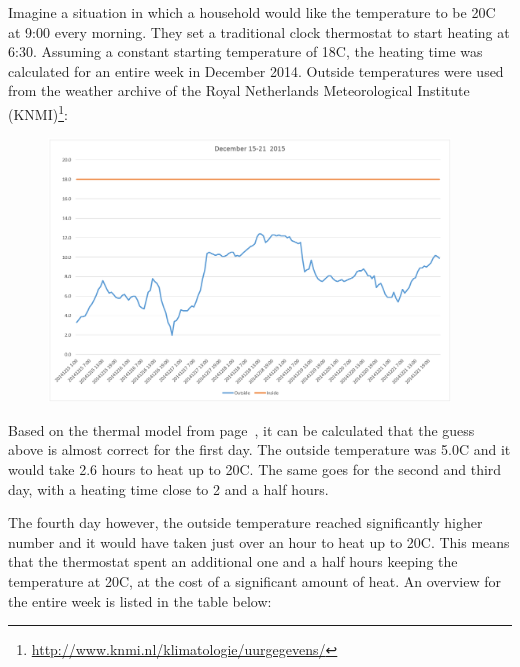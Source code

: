 \documentclass[12pt,a4paper,final]{report}
\begin{document}
Imagine a situation in which a household would like the temperature to be 20\degree{}C at 9:00 every morning. They set a traditional clock thermostat to start heating at 6:30. Assuming a constant starting temperature of 18\degree{}C, the heating time was calculated for an entire week in December 2014. Outside temperatures were used from the weather archive of the Royal Netherlands Meteorological Institute (KNMI)\footnote{\url{http://www.knmi.nl/klimatologie/uurgegevens/}}:
\begin{figure}[H]
  \begin{center}
      \includegraphics[width=0.95\textwidth]{EnergySavings-compare}
  \end{center}
\end{figure}

Based on the thermal model from page~\pageref{sec:usingModel}, it can be calculated that the guess above is almost correct for the first day. The outside temperature was 5.0\degree{}C and it would take 2.6 hours to heat up to 20\degree{}C. The same goes for the second and third day, with a heating time close to 2 and a half hours.

The fourth day however, the outside temperature reached significantly higher number and it would have taken just over an hour to heat up to 20\degree{}C. This means that the thermostat spent an additional one and a half hours keeping the temperature at 20\degree{}C, at the cost of a significant amount of heat. An overview for the entire week is listed in the table below:
\end{document}
